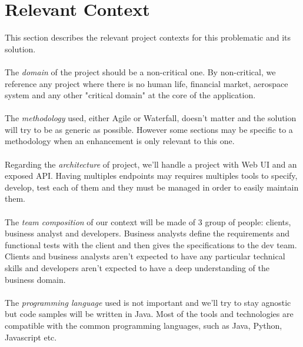 \section{Relevant Context}\label{sec:relevant-context}
This section describes the relevant project contexts for this problematic
and its solution. \\ \\
The \textit{domain} of the project should be a non-critical one.
By non-critical, we reference any project where there is no human life,
financial market, aerospace system and any other "critical domain" at
the core of the application.\\ \\
The \textit{methodology} used, either Agile or Waterfall, doesn't
matter and the solution will try to be as generic as possible.
However some sections may be specific to a methodology when an enhancement is
only relevant to this one. \\ \\
Regarding the \textit{architecture} of project, we'll handle a project with
Web UI and an exposed API\@.
Having multiples endpoints may requires multiples tools to specify, develop,
test each of them and they must be managed in order to easily maintain them.
\\ \\
The \textit{team composition} of our context will be made of 3 group of people:
clients, business analyst and developers.
Business analysts define the requirements and functional tests with the client
and then gives the specifications to the dev team.
Clients and business analysts aren't expected to have any particular technical
skills and developers aren't expected to have a deep understanding of the
business domain. \\ \\
The \textit{programming language} used is not important and we'll try to stay
agnostic but code samples will be written in Java.
Most of the tools and technologies are compatible with the common programming
languages, such as Java, Python, Javascript etc.
